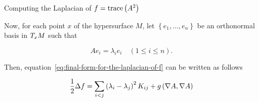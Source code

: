 \begin{frame}[allowframebreaks]{Computing the Laplacian of \(f=\trace{A^{2}}\)}
  \framebreak

  Now, for each point \(x\) of the hypersurface \(M\), let
  \(\left\{e_{1},\ldots,e_{n}\right\}\) be an orthonormal basis in
  \(\tangentspace{M}{x}\) such that

  \[
    Ae_{i}=\lambda_{i}e_{i}\quad{(1\leqslant{i}\leqslant{n})}.
  \]

  Then, equation~\eqref{eq:final-form-for-the-laplacian-of-f} can be written as
  follows

  \begin{equation}\label{eq:formula-for-the-laplacian-of-f-containing-the-sectional-curvature-of-the-immersion}
    \frac{1}{2}\laplacian{f}
    =\sum_{i<j}\left(\lambda_{i}-\lambda_{j}\right)^{2}K_{ij}+g\left(\immersionconn{A},\immersionconn{A}\right)
  \end{equation}
  
\end{frame}
